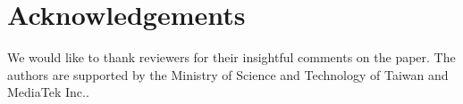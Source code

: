 \documentclass{article}
\begin{document}

\section{Acknowledgements}
We would like to thank reviewers for their insightful comments on the paper.
The authors are supported by the Ministry of Science and Technology of Taiwan and MediaTek Inc..



\end{document}
